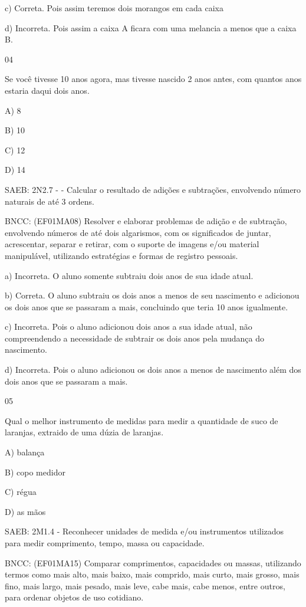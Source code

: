 \begin{itemize}
\begin{itemize}
c) Correta. Pois assim teremos dois morangos em cada caixa

d) Incorreta. Pois assim a caixa A ficara com uma melancia a menos que a
caixa B.

\num{04}

Se você tivesse 10 anos agora, mas tivesse nascido 2 anos antes, com
quantos anos estaria daqui dois anos.

A) 8

B) 10

C) 12

D) 14

SAEB: 2N2.7 - - Calcular o resultado de adições e subtrações, envolvendo
número naturais de até 3 ordens.

BNCC: (EF01MA08) Resolver e elaborar problemas de adição e de subtração,
envolvendo números de até dois algarismos, com os significados de
juntar, acrescentar, separar e retirar, com o suporte de imagens e/ou
material manipulável, utilizando estratégias e formas de registro
pessoais.

a) Incorreta. O aluno somente subtraiu dois anos de sua idade atual.

b) Correta. O aluno subtraiu os dois anos a menos de seu nascimento e
adicionou os dois anos que se passaram a mais, concluindo que teria 10
anos igualmente.

c) Incorreta. Pois o aluno adicionou dois anos a sua idade atual, não
compreendendo a necessidade de subtrair os dois anos pela mudança do
nascimento.

d) Incorreta. Pois o aluno adicionou os dois anos a menos de nascimento
além dos dois anos que se passaram a mais.

\num{05}

Qual o melhor instrumento de medidas para medir a quantidade de suco de
laranjas, extraido de uma dúzia de laranjas.

A) balança

B) copo medidor

C) régua

D) as mãos

SAEB: 2M1.4 - Reconhecer unidades de medida e/ou instrumentos utilizados
para medir comprimento, tempo, massa ou capacidade.

BNCC: (EF01MA15) Comparar comprimentos, capacidades ou massas,
utilizando termos como mais alto, mais baixo, mais comprido, mais curto,
mais grosso, mais fino, mais largo, mais pesado, mais leve, cabe mais,
cabe menos, entre outros, para ordenar objetos de uso cotidiano.


\end{itemize}
\end{itemize}
